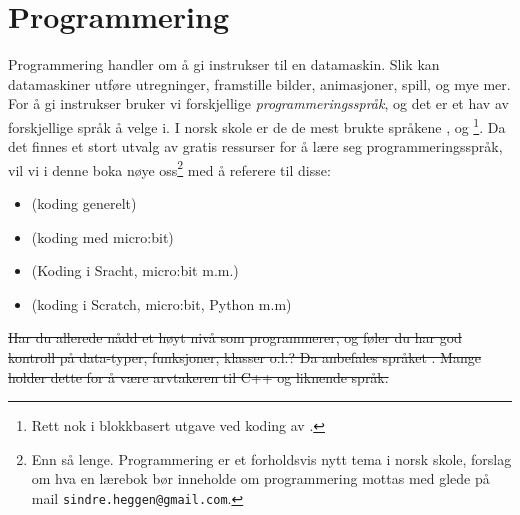 



\section{Programmering}
Programmering handler om å gi instrukser til en datamaskin. Slik kan datamaskiner utføre utregninger, framstille bilder, animasjoner, spill, og mye mer. For å gi instrukser bruker vi forskjellige \textit{programmeringsspråk}, og det er et hav av forskjellige språk å velge i. I norsk skole er de de mest brukte språkene ,  og \footnote{Rett nok i blokkbasert utgave ved koding av .}. Da det finnes et stort utvalg av gratis ressurser for å lære seg programmeringsspråk, vil vi i denne boka nøye oss\footnote{Enn så lenge. Programmering er et forholdsvis nytt tema i norsk skole, forslag om hva en lærebok bør inneholde om programmering mottas med glede på mail {\tt{sindre.heggen@gmail.com}}.} med å referere til disse:
\begin{itemize}
	\item {} (koding generelt)
	\item {} (koding med micro:bit)
	\item {} (Koding i Sracht, micro:bit m.m.)
	\item {} (koding i Scratch, micro:bit, Python m.m)
\end{itemize} \vsk

\st{Har du allerede nådd et høyt nivå som programmerer, og føler du har god kontroll på data-typer, funksjoner, klasser o.l.? Da anbefales språket . Mange holder dette for å være arvtakeren til C++ og liknende språk.}



